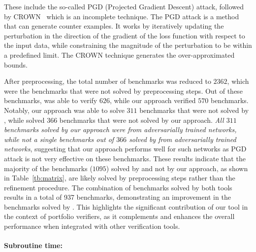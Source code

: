 These include the so-called PGD (Projected Gradient Descent) attack, followed by CROWN~\cite{zhang2018efficient} which is an incomplete technique. The PGD attack is a method that can generate counter examples. It works by iteratively updating the  perturbation in the direction of the gradient of the loss function with respect to the input data,  while constraining the magnitude of the perturbation to be within a predefined limit. The CROWN technique generates the over-approximated bounds. %

After preprocessing, the total number of benchmarks was reduced to $2362$, which were the benchmarks that were not 
solved by preprocessing steps. Out of these benchmarks, \alphabeta{} was able to verify $626$, 
while our approach verified 
$570$ benchmarks. Notably, our approach was able to solve $311$ benchmarks that were not solved by \alphabeta{}, 
while \alphabeta{} solved $366$ benchmarks that were not solved by our approach. 
\textit{All $311$ benchmarks solved by our approach were from adversarially trained networks, while 
not a single benchmarks out of $366$ solved by \alphabeta{} from adversarially trained networks}, 
suggesting that our approach performs 
well for such networks as PGD attack is not very effective on these benchmarks. 
These results indicate that the majority of the benchmarks ($1095$) solved by \alphabeta{} and not by our approach, 
as shown in Table~\ref{tb:matrix}, are likely solved by preprocessing steps rather than the refinement procedure.
The combination of benchmarks solved by both tools results in a total of 937 benchmarks, 
demonstrating an improvement in the benchmarks solved by \alphabeta{}. 
This highlights the significant contribution of our tool in the context of portfolio verifiers, 
as it complements and enhances the overall performance when integrated with other verification tools.


\paragraph{Subroutine time: }


